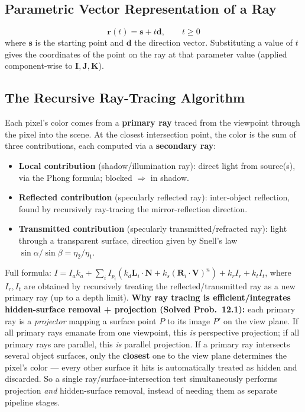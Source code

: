 \documentclass[12pt, a4paper]{article}
\newenvironment{answerbox}{\begin{mdframed}[style=answerframe]}{\end{mdframed}}
\begin{document}
\subsection{Parametric Vector Representation of a Ray}
\begin{answerbox}
$$\mathbf{r}(t) = \mathbf{s} + t\mathbf{d}, \qquad t\ge0$$
where $\mathbf{s}$ is the starting point and $\mathbf{d}$ the direction vector. Substituting a value of $t$ gives the coordinates of the point on the ray at that parameter value (applied component-wise to $\mathbf{I},\mathbf{J},\mathbf{K}$).
\end{answerbox}

\subsection{The Recursive Ray-Tracing Algorithm}
\begin{answerbox}
Each pixel's color comes from a \textbf{primary ray} traced from the viewpoint through the pixel into the scene. At the closest intersection point, the color is the sum of three contributions, each computed via a \textbf{secondary ray}:
\begin{itemize}[noitemsep]
  \item \textbf{Local contribution} (shadow/illumination ray): direct light from source(s), via the Phong formula; blocked $\Rightarrow$ in shadow.
  \item \textbf{Reflected contribution} (specularly reflected ray): inter-object reflection, found by recursively ray-tracing the mirror-reflection direction.
  \item \textbf{Transmitted contribution} (specularly transmitted/refracted ray): light through a transparent surface, direction given by Snell's law $\sin\alpha/\sin\beta=\eta_2/\eta_1$.
\end{itemize}
Full formula: $I = I_ak_a + \sum_i I_{p_i}(k_d\mathbf{L}_i\!\cdot\!\mathbf{N}+k_s(\mathbf{R}_i\!\cdot\!\mathbf{V})^n) + k_rI_r + k_tI_t$, where $I_r,I_t$ are obtained by recursively treating the reflected/transmitted ray as a new primary ray (up to a depth limit).
\textbf{Why ray tracing is efficient/integrates hidden-surface removal + projection (Solved Prob.\ 12.1):} each primary ray is a \emph{projector} mapping a surface point $P$ to its image $P'$ on the view plane. If all primary rays emanate from one viewpoint, this \emph{is} perspective projection; if all primary rays are parallel, this \emph{is} parallel projection. If a primary ray intersects several object surfaces, only the \textbf{closest} one to the view plane determines the pixel's color --- every other surface it hits is automatically treated as hidden and discarded. So a single ray/surface-intersection test simultaneously performs projection \emph{and} hidden-surface removal, instead of needing them as separate pipeline stages.
\end{answerbox}
\end{document}

